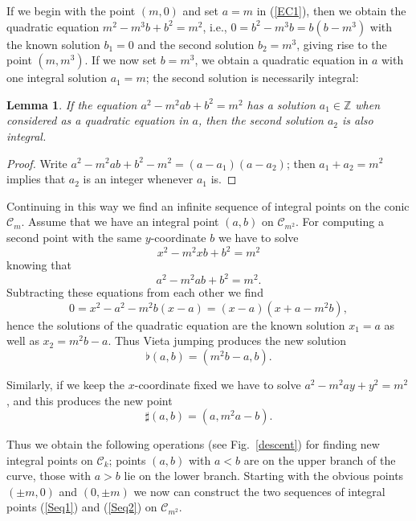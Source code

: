 \documentclass{amsart}
\newtheorem{lemma}{Lemma}
\newcommand{\Z}{{\mathbb Z}}
\newcommand{\cC}{{\mathcal C}}
\begin{document}
If we begin with the point $(m,0)$ and set $a = m$ in (\ref{EC1}), then
we obtain the quadratic equation $m^2 - m^3b + b^2 = m^2$, i.e.,
$0 = b^2 - m^3b = b(b-m^3)$ with the known solution $b_1 = 0$ and the
second solution $b_2 = m^3$, giving rise to the point $(m, m^3)$.
If we now set $b = m^3$, we obtain a quadratic equation in $a$ with
one integral solution $a_1 = m$; the second solution is necessarily
integral:

\begin{lemma}\label{LemInt}
  If the equation $a^2 - m^2ab + b^2 = m^2$ has a solution $a_1  \in \Z$
  when considered as a quadratic equation in $a$, then the second solution
  $a_2$ is also integral.
\end{lemma}

\begin{proof}
  Write $a^2 - m^2ab + b^2 - m^2 = (a-a_1)(a-a_2)$; then
  $a_1 + a_2 = m^2$ implies that $a_2$ is an integer whenever $a_1$ is.  
\end{proof}

Continuing in this way we find an infinite sequence of integral
points on the conic $\cC_m$. Assume that we have an integral point 
$(a,b)$ on $\cC_{m^2}$. For computing a second point with the same
$y$-coordinate $b$ we have to solve
$$ x^2 - m^2xb + b^2 = m^2 $$
knowing that
$$ a^2 - m^2ab + b^2 = m^2. $$
Subtracting these equations from each other we find
$$ 0 = x^2 - a^2 - m^2b(x-a) = (x-a)(x+a-m^2b), $$
hence the solutions of the quadratic equation are the known solution
$x_1 = a$ as well as $x_2 = m^2b - a$. Thus Vieta jumping produces the
new solution
$$ \flat(a,b) = (m^2b-a,b). $$

Similarly, if we keep the $x$-coordinate fixed we have to solve
$a^2 - m^2ay + y^2 = m^2$, and this produces the new point
$$ \sharp(a,b) = (a,m^2a-b). $$

Thus we obtain the following operations (see Fig.~\ref{descent}) for
finding new integral points on $\cC_k$; points $(a,b)$ with $a < b$
are on the upper branch of the curve, those with $a > b$ lie on the
lower branch. Starting with the obvious points $(\pm m, 0)$ and
$(0, \pm m)$ we now can construct the two sequences of integral points
(\ref{Seq1}) and (\ref{Seq2}) on $\cC_{m^2}$.
\end{document}
